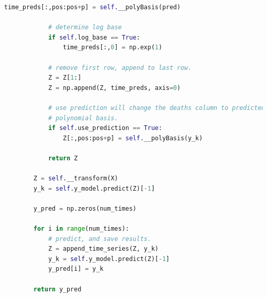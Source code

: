 \begin{lstlisting}[language=Python, caption=AutoRegressor class implementation]
                time_preds[:,pos:pos+p] = self.__polyBasis(pred)

            # determine log base
            if self.log_base == True:
                time_preds[:,0] = np.exp(1)

            # remove first row, append to last row.
            Z = Z[1:]
            Z = np.append(Z, time_preds, axis=0)

            # use prediction will change the deaths column to predicted value and its
            # polynomial basis.
            if self.use_prediction == True:
                Z[:,pos:pos+p] = self.__polyBasis(y_k)

            return Z

        Z = self.__transform(X)
        y_k = self.y_model.predict(Z)[-1]
        
        y_pred = np.zeros(num_times)

        for i in range(num_times):
            # predict, and save results.
            Z = append_time_series(Z, y_k)
            y_k = self.y_model.predict(Z)[-1]
            y_pred[i] = y_k

        return y_pred
\end{lstlisting}

